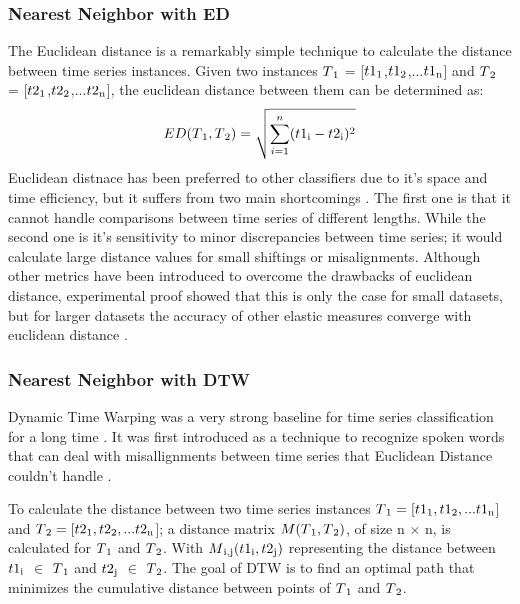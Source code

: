 \subsubsection{Nearest Neighbor with ED}
The Euclidean distance is a remarkably simple technique to calculate the distance between time series instances.
Given two instances  $T\textsubscript{1}$ = [$t1\textsubscript{1}$,$t1\textsubscript{2}$,...$t1\textsubscript{n}$]
and $T\textsubscript{2}$ = [$t2\textsubscript{1}$,$t2\textsubscript{2}$,...$t2\textsubscript{n}$], the euclidean distance
between them can be determined as:
\begin{equation}
    ED(T\textsubscript{1},T\textsubscript{2})= \sqrt{\sum_{i=1}^{n} (t1\textsubscript{i} - t2\textsubscript{i})^{2}}
\end{equation}
Euclidean distnace has been preferred to other classifiers due to it's space and time efficiency, but it suffers from two main shortcomings \cite{baydogan2013bag, jeong2011weighted,kate2016using}.
The first one is that it cannot handle comparisons between time series of different lengths.
While the second one is it's sensitivity to minor discrepancies between time series; it would calculate large distance values for small shiftings or misalignments.
Although other metrics have been introduced to overcome the drawbacks of euclidean distance,
experimental proof showed that this is only the case for small datasets, but for larger datasets the accuracy of other elastic measures
converge with euclidean distance \cite{hills2014classification,ding2008querying,bagnall2012transformation}.


\subsubsection{Nearest Neighbor with DTW}
\label{SubsubsectionDTW}
Dynamic Time Warping was a very strong baseline for time series classification for a long time \cite{abanda2019review,bagnall2017great}.
It was first introduced as a technique to recognize spoken words that can deal with misallignments between time series
that Euclidean Distance couldn't handle \cite{tan2020fastee}.

To calculate the distance between two time series instances  $T\textsubscript{1} = [t1\textsubscript{1},t1\textsubscript{2},...t1\textsubscript{n}$]
and $T\textsubscript{2} = [t2\textsubscript{1},t2\textsubscript{2},...t2\textsubscript{n}$];
a distance matrix $M(T\textsubscript{1},T\textsubscript{2})$, of size n $\times$ n, is calculated for $T\textsubscript{1}$ and $T\textsubscript{2}$.
With $M\textsubscript{i,j}(t1\textsubscript{i},t2\textsubscript{j})$ representing the distance between $t1\textsubscript{i}$ $\in$ $T\textsubscript{1}$
and $t2\textsubscript{j}$ $\in$ $T\textsubscript{2}$.
The goal of DTW is to find an optimal path that minimizes the cumulative distance between points of $T\textsubscript{1}$ and $T\textsubscript{2}$.


